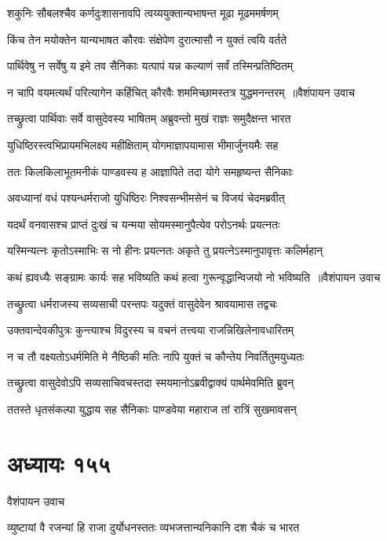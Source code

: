 \twolineshloka
{शकुनिः सौबलश्चैव कर्णदुःशासनावपि}
{त्वय्ययुक्तान्यभाषन्त मूढा मूढममर्षणम्}


\twolineshloka
{किंच तेन मयोक्तेन यान्यभाषत कौरवः}
{संक्षेपेण दुरात्मासौ न युक्तं त्वयि वर्तते}


\twolineshloka
{पार्थिवेषु न सर्वेषु य इमे तव सैनिकाः}
{यत्पापं यन्न कल्याणं सर्वं तस्मिन्प्रतिष्ठितम्}


\threelineshloka
{न चापि वयमत्यर्थं परित्यागेन कर्हिचित्}
{कौरवैः शममिच्छामस्तत्र युद्धमनन्तरम् ॥वैशंपायन उवाच}
{}


\twolineshloka
{तच्छ्रुत्वा पार्थिवाः सर्वे वासुदेवस्य भाषितम्}
{अब्रुवन्तो मुखं राज्ञः समुदैक्षन्त भारत}


\twolineshloka
{युधिष्ठिरस्त्वभिप्रायमभिलक्ष्य महीक्षिताम्}
{योगमाज्ञापयामास भीमार्जुनयमैः सह}


\twolineshloka
{ततः किलकिलाभूतमनीकं पाण्डवस्य ह}
{आज्ञापिते तदा योगे समहृष्यन्त सैनिकाः}


\twolineshloka
{अवध्यानां वधं पश्यन्धर्मराजो युधिष्ठिरः}
{निश्वसन्भीमसेनं च विजयं चेदमब्रवीत्}


\twolineshloka
{यदर्थं वनवासश्च प्राप्तं दुःखं च यन्मया}
{सोयमस्मानुपैत्येव परोऽनर्थः प्रयत्नतः}


\twolineshloka
{यस्मिन्यत्नः कृतोऽस्माभिः स नो हीनः प्रयत्नतः}
{अकृते तु प्रयत्नेऽस्मानुपावृत्तः कलिर्महान्}


\threelineshloka
{कथं ह्यवध्यैः सङ्ग्रामः कार्यः सह भविष्यति}
{कथं हत्वा गुरून्वृद्धान्विजयो नो भविष्यति ॥वैशंपायन उवाच}
{}


\twolineshloka
{तच्छ्रुत्वा धर्मराजस्य सव्यसाची परन्तपः}
{यदुक्तं वासुदेवेन श्रावयामास तद्वचः}


\twolineshloka
{उक्तवान्देवकीपुत्रः कुन्त्याश्च विदुरस्य च}
{वचनं तत्त्वया राजन्निखिलेनावधारितम्}


\twolineshloka
{न च तौ वक्ष्यतोऽधर्ममिति मे नैष्ठिकी मतिः}
{नापि युक्तं च कौन्तेय निवर्तितुमयुध्यतः}


\twolineshloka
{तच्छ्रुत्वा वासुदेवोऽपि सव्यसाचिवचस्तदा}
{स्मयमानोऽब्रवीद्वाक्यं पार्थमेवमिति ब्रुवन्}


\twolineshloka
{ततस्ते धृतसंकल्पा युद्धाय सह सैनिकाः}
{पाण्डवेया महाराज तां रात्रिं सुखमावसन्}


\chapter{अध्यायः १५५}
\twolineshloka
{वैशंपायन उवाच}
{}


\twolineshloka
{व्युष्टायां वै रजन्यां हि राजा दुर्योधनस्ततः}
{व्यभजत्तान्यनिकानि दश चैकं च भारत}


